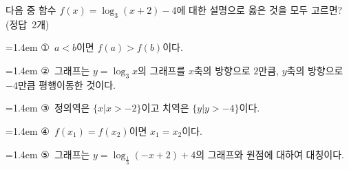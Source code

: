 다음 중 함수 $f(x)=\log_3 (x+2)-4$에 대한 설명으로 옳은 것을 모두 고르면? \mbox{(정답 2개)}
\par\medskip\par\noindent\hangindent=1.4em {\small ①}\ $a<b$이면 $f(a)>f(b)$이다.\par\noindent\hangindent=1.4em {\small ②}\ 그래프는 $y=\log_3 x$의 그래프를 $x$축의 방향으로 $2$만큼, $y$축의 방향으로 $-4$만큼 평행이동한 것이다.\par\noindent\hangindent=1.4em {\small ③}\ 정의역은 $\{x|x>-2\}$이고 치역은 $\{y|y>-4\}$이다.\par\noindent\hangindent=1.4em {\small ④}\ $f(x_1)=f(x_2)$이면 $x_1=x_2$이다.\par\noindent\hangindent=1.4em {\small ⑤}\ 그래프는 $y=\log_{\frac{1}{3}} (-x+2)+4$의 그래프와 원점에 대하여 대칭이다.\par\medskip
